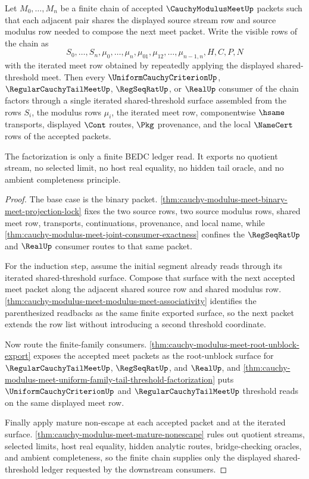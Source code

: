 \begin{theorem}
\label{thm:cauchy-modulus-meet-finite-chain-threshold-induction}
Let $M_0,\ldots,M_n$ be a finite chain of accepted $\CauchyModulusMeetUp$ packets such that each adjacent pair shares the displayed source stream row and source modulus row needed to compose the next meet packet. Write the visible rows of the chain as
$$
S_0,\ldots,S_n,\mu_0,\ldots,\mu_n,\mu_{01},\mu_{12},\ldots,\mu_{n-1,n},H,C,P,N
$$
with the iterated meet row obtained by repeatedly applying the displayed shared-threshold meet. Then every $\UniformCauchyCriterionUp$, $\RegularCauchyTailMeetUp$, $\RegSeqRatUp$, or $\RealUp$ consumer of the chain factors through a single iterated shared-threshold surface assembled from the rows $S_i$, the modulus rows $\mu_i$, the iterated meet row, componentwise $\hsame$ transports, displayed $\Cont$ routes, $\Pkg$ provenance, and the local $\NameCert$ rows of the accepted packets.

The factorization is only a finite BEDC ledger read. It exports no quotient stream, no selected limit, no host real equality, no hidden tail oracle, and no ambient completeness principle.
\end{theorem}
\begin{proof}
The base case is the binary packet. \autoref{thm:cauchy-modulus-meet-binary-meet-projection-lock} fixes the two source rows, two source modulus rows, shared meet row, transports, continuations, provenance, and local name, while \autoref{thm:cauchy-modulus-meet-joint-consumer-exactness} confines the $\RegSeqRatUp$ and $\RealUp$ consumer routes to that same packet.

For the induction step, assume the initial segment already reads through its iterated shared-threshold surface. Compose that surface with the next accepted meet packet along the adjacent shared source row and shared modulus row. \autoref{thm:cauchy-modulus-meet-modulus-meet-associativity} identifies the parenthesized readbacks as the same finite exported surface, so the next packet extends the row list without introducing a second threshold coordinate.

Now route the finite-family consumers. \autoref{thm:cauchy-modulus-meet-root-unblock-export} exposes the accepted meet packets as the root-unblock surface for $\RegularCauchyTailMeetUp$, $\RegSeqRatUp$, and $\RealUp$, and \autoref{thm:cauchy-modulus-meet-uniform-family-tail-threshold-factorization} puts $\UniformCauchyCriterionUp$ and $\RegularCauchyTailMeetUp$ threshold reads on the same displayed meet row.

Finally apply mature non-escape at each accepted packet and at the iterated surface. \autoref{thm:cauchy-modulus-meet-mature-nonescape} rules out quotient streams, selected limits, host real equality, hidden analytic routes, bridge-checking oracles, and ambient completeness, so the finite chain supplies only the displayed shared-threshold ledger requested by the downstream consumers.
\end{proof}

